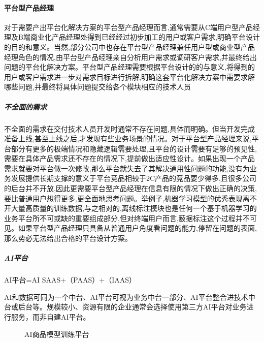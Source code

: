 \documentclass[letterpaper,11pt,english]{sphinxmanual}
\begin{document}
\paragraph{平台型产品经理}
\label{\detokenize{chapter_introduction/platform:id4}}
对于需要产出平台化解决方案的平台型产品经理而言,通常需要从C端用户型产品经理及B端商业化产品经理处得到已经经过初步加工的用户或客户需求,明确平台设计的目的和意义。当然,部分公司中也存在平台型产品经理兼任用户型或商业型产品经理角色的情况,由平台型产品经理亲自分析用户需求或调研客户需求,并最终给出问题的平台化解决方案。平台型产品经理需要根据平台设计的的与意义,将得到的用户或客户需求进一步对需求目标进行拆解,明确这套平台化解决方案中需要求解哪些问题,并最终将具体问题提交给各个模块相应的技术人员


\subparagraph{不全面的需求}
\label{\detokenize{chapter_introduction/platform:id5}}
不全面的需求在交付技术人员开发时通常不存在问题,具体而明确。但当开发完成准备上线,甚至上线之后,才发现有些业务场景的情况。对于平台型产品经理来说,平台部分有更多的极端情况和隐藏逻辑需要处理,且平台的设计需要有足够的预见性,需要在具体产品需求还不存在的情况下,提前做出适应性设计。如果出现一个产品需求就要对平台做一次修改,那么平台就失去了其解决通用性问题的功能,没有为业务发展提供长期支撑的意义于平台竞品相较于2C产品的竞品要少得多,且很多公司的后台并不开放,因此更需要平台型产品经理在信息有限的情况下做出正确的决策,要比普通用户想得更多,更全面地思考问题。举例子,机器学习模型的优秀表现离不开大量高质量的训练数据,与之相对的,离线标注模块也是任何一个基于机器学习的业务平台所不可或缺的重要组成部分,但对终端用户而言,薮据标注这个过程并不可见。如果平台型产品经理只具备从普通用户角度看问题的能力,停留在问题的表面,那么势必无法给出合格的平台设计方案。
%
\begin{footnote}[99]\sphinxAtStartFootnote
{}
%
\end{footnote}


\subparagraph{AI平台}
\label{\detokenize{chapter_introduction/platform:ai}}
AI平台=AI SAAS+（PAAS）+（IAAS）

AI和数据可同为一个中台、AI平台可视为业务中台一部分、AI平台整合进技术中台或后台等。规模较小、资源有限的企业通常会选择使用第三方AI平台对业务进行服务，而非自建AI平台。

\begin{figure}[H]
\centering
\capstart

\noindent{}
\caption{AI商品模型训练平台}\label{\detokenize{chapter_introduction/platform:id11}}\end{figure}
\end{document}
